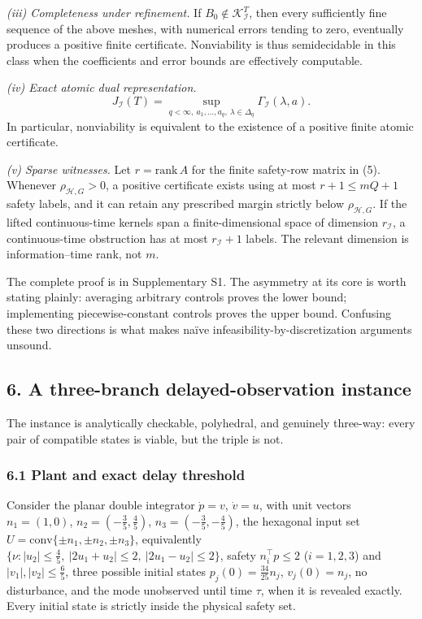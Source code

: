 \documentclass[10pt,twocolumn]{article}
\theoremstyle{definition}
\begin{document}
\emph{(iii) Completeness under refinement.} If
\(B_0 \notin \mathcal{K}_{\mathcal{I}}^T\), then every sufficiently fine
sequence of the above meshes, with numerical errors tending to zero,
eventually produces a positive finite certificate. Nonviability is thus
semidecidable in this class when the coefficients and error bounds are
effectively computable.

\emph{(iv) Exact atomic dual representation.}
\[
J_{\mathcal{I}}(T) = \sup_{q < \infty,\ a_1,\dots,a_q,\
\lambda \in \Delta_q} \Gamma_{\mathcal{I}}(\lambda, a).
\tag{10}
\]
In particular, nonviability is equivalent to the existence of a positive
finite atomic certificate.

\emph{(v) Sparse witnesses.} Let \(r = \mathrm{rank}\, A\) for the finite
safety-row matrix in (5). Whenever \(\rho_{\mathcal{H},G} > 0\), a positive
certificate exists using at most
\(r + 1 \le mQ + 1\) safety labels, and it can retain any prescribed margin
strictly below \(\rho_{\mathcal{H},G}\). If the lifted continuous-time
kernels span a finite-dimensional space of dimension \(r_{\mathcal{I}}\), a
continuous-time obstruction has at most \(r_{\mathcal{I}} + 1\) labels. The
relevant dimension is information--time rank, not \(m\).

The complete proof is in Supplementary S1. The asymmetry at its core is
worth stating plainly: averaging arbitrary controls proves the lower bound;
implementing piecewise-constant controls proves the upper bound. Confusing
these two directions is what makes na\"ive infeasibility-by-discretization
arguments unsound.

\subsection{6. A three-branch delayed-observation instance}\label{instance}

The instance is analytically checkable, polyhedral, and genuinely three-way:
every pair of compatible states is viable, but the triple is not.

\subsubsection{6.1 Plant and exact delay threshold}\label{plant}

Consider the planar double integrator \(\dot p = v\), \(\dot v = u\), with
unit vectors \(n_1 = (1,0)\), \(n_2 = (-\tfrac35, \tfrac45)\),
\(n_3 = (-\tfrac35, -\tfrac45)\), the hexagonal input set
\(U = \mathrm{conv}\{\pm n_1, \pm n_2, \pm n_3\}\), equivalently
\(\{\nu : |u_2| \le \tfrac45,\ |2u_1 + u_2| \le 2,\ |2u_1 - u_2| \le 2\}\),
safety \(n_i^\top p \le 2\) (\(i = 1,2,3\)) and \(|v_1|, |v_2| \le \tfrac65\),
three possible initial states \(p_j(0) = \tfrac{34}{25} n_j\),
\(v_j(0) = n_j\), no disturbance, and the mode unobserved until time \(\tau\),
when it is revealed exactly. Every initial state is strictly inside the
physical safety set.
\end{document}
